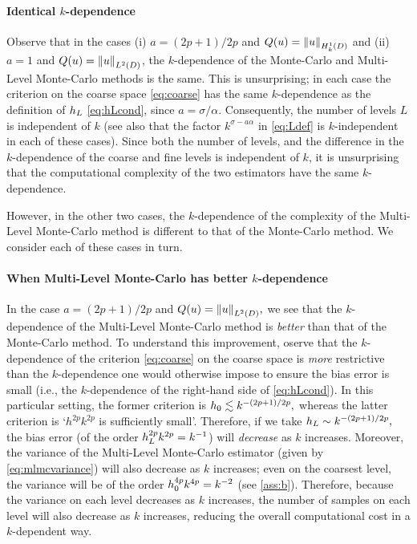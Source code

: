 \paragraph{Identical $k$-dependence} Observe that in the cases (i) $a = (2p+1)/2p$ and $Q(u) = \NHokD{u}$ and (ii) $a=1$ and $Q(u) = \NLtD{u}$, the $k$-dependence of the Monte-Carlo and Multi-Level Monte-Carlo methods is the same. This is unsurprising; in each case the criterion on the coarse space \cref{eq:coarse} has the same $k$-dependence as the definition of $h_{L}$ \cref{eq:hLcond}, since $a = \sigma/\alpha.$ Consequently, the number of levels $L$ is independent of $k$ (see also that the factor $k^{\sigma - a\alpha}$ in \cref{eq:Ldef} is $k$-independent in each of these cases). Since both the number of levels, and the difference in the $k$-dependence of the coarse and fine levels is independent of $k$, it is unsurprising that the computational complexity of the two estimators have the same $k$-dependence.

However, in the other two cases, the $k$-dependence of the complexity of the Multi-Level Monte-Carlo method is different to that of the Monte-Carlo method. We consider each of these cases in turn.

\paragraph{When Multi-Level Monte-Carlo has better $k$-dependence} In the case $a=(2p+1)/2p$ and $Q(u) = \NLtD{u},$ we see that the $k$-dependence of the Multi-Level Monte-Carlo method is \emph{better} than that of the Monte-Carlo method. To understand this improvement, oserve that the $k$-dependence of the criterion \cref{eq:coarse} on the coarse space is \emph{more} restrictive than the $k$-dependence one would otherwise impose to ensure the bias error is small (i.e., the $k$-dependence of the right-hand side of \cref{eq:hLcond}). In this particular setting, the former criterion is $h_{0} \lesssim k^{-(2p+1)/2p},$ whereas the latter criterion is `$h^{2p}k^{2p}$ is sufficiently small'. Therefore, if we take $h_{L} \sim k^{-(2p+1)/2p},$ the bias error (of the order $h_{L}^{2p}k^{2p} = k^{-1}$) will \emph{decrease} as $k$ increases. Moreover, the variance of the Multi-Level Monte-Carlo estimator (given by \cref{eq:mlmcvariance}) will also decrease as $k$ increases; even on the coarsest level, the variance will be of the order $h_{0}^{4p}k^{4p} = k^{-2}$ (see \cref{ass:b}). Therefore, because the variance on each level decreases as $k$ increases, the number of samples on each level will also decrease as $k$ increases, reducing the overall computational cost in a $k$-dependent way.

